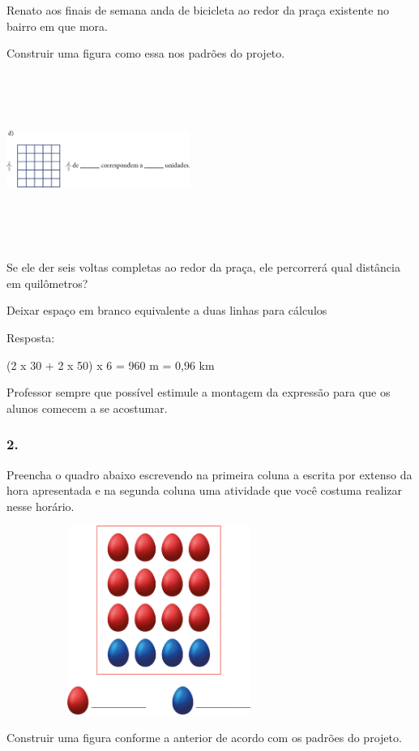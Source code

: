 Renato aos finais de semana anda de bicicleta ao redor da praça
existente no bairro em que mora.

Construir uma figura como essa nos padrões do projeto.

\includegraphics[width=2.35256in,height=2.20730in]{media/image61.png}

Se ele der seis voltas completas ao redor da praça, ele percorrerá qual
distância em quilômetros?

Deixar espaço em branco equivalente a duas linhas para cálculos

Resposta:

(2 x 30 + 2 x 50) x 6 = 960 m = 0,96 km

Professor sempre que possível estimule a montagem da expressão para que
os alunos comecem a se acostumar.

\subsubsection{2.}\label{section-53}

Preencha o quadro abaixo escrevendo na primeira coluna a escrita por
extenso da hora apresentada e na segunda coluna uma atividade que você
costuma realizar nesse horário.

\includegraphics[width=3.91667in,height=2.42344in]{media/image62.png}

Construir uma figura conforme a anterior de acordo com os padrões do
projeto.

